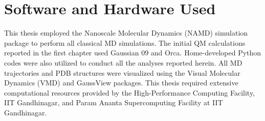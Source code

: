 \section{Software and Hardware Used}
This thesis employed the Nanoscale Molecular Dynamics (NAMD) simulation package to perform all classical MD simulations. The initial QM calculations reported in the first chapter used Gaussian 09 and Orca. Home-developed Python codes were also utilized to conduct all the analyses reported herein. All MD trajectories and PDB structures were visualized using the Visual Molecular Dynamics (VMD) and GaussView packages. This thesis required extensive computational resources provided by the High-Performance Computing Facility, IIT Gandhinagar, and Param Ananta Supercomputing Facility at IIT Gandhinagar. 